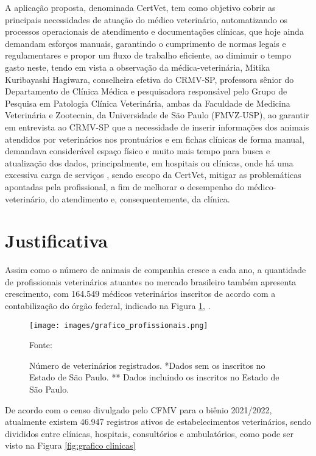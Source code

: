 \documentclass[
    12pt,               %
    openright,          %
    oneside,
    a4paper,            %
    BIBLATEX,           %
    TODO,               %
    english,            %
    brazil              %
    ]{ifsp-spo-inf-ctds}
\begin{document}
    A aplicação proposta, denominada CertVet, tem como objetivo cobrir as principais necessidades de atuação do médico veterinário, automatizando os processos operacionais de atendimento e documentações clínicas, que hoje ainda demandam esforços manuais, garantindo o cumprimento de normas legais e regulamentares e propor um fluxo de trabalho eficiente, ao diminuir o tempo gasto neste, tendo em vista a observação da médica-veterinária, Mitika Kuribayashi Hagiwara, conselheira efetiva do CRMV-SP, professora sênior do Departamento de Clínica Médica e pesquisadora responsável pelo Grupo de Pesquisa em Patologia Clínica Veterinária, ambas da Faculdade de Medicina Veterinária e Zootecnia, da Universidade de São Paulo (FMVZ-USP), ao garantir em entrevista ao CRMV-SP que a necessidade de inserir informações dos animais atendidos por veterinários nos prontuários e em fichas clínicas de forma manual, demandava considerável espaço físico e muito mais tempo para busca e atualização dos dados, principalmente, em hospitais ou clínicas, onde há uma excessiva carga de serviços \cite{mitika}, sendo escopo da CertVet, mitigar as problemáticas apontadas pela profissional, a fim de melhorar o desempenho do médico-veterinário, do atendimento e, consequentemente, da clínica.


    \section{Justificativa}\label{justificativa}

    Assim como o número de animais de companhia cresce a cada ano, a quantidade de profissionais veterinários atuantes no mercado brasileiro também apresenta crescimento, com 164.549 médicos veterinários inscritos de acordo com a contabilização do órgão federal, indicado na Figura \ref{fig:grafico vet}, .
    
    \begin{figure}[H]
        \centering
        \texttt{[image: images/grafico\_profissionais.png]}
        \caption{Número de veterinários registrados. *Dados sem os inscritos no Estado de São Paulo. ** Dados incluindo os inscritos no Estado de São Paulo.}
        \footnotesize {Fonte:  }
        \label{fig:grafico vet}
    \end{figure}
    
    De acordo com o censo divulgado pelo CFMV para o biênio 2021/2022, atualmente existem 46.947 registros ativos de estabelecimentos veterinários, sendo divididos entre clínicas, hospitais, consultórios e ambulatórios, como pode ser visto                            na Figura \ref{fig:grafico clinicas} 
    
\end{document}
